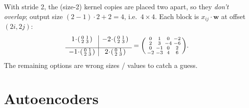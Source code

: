 \documentclass[11pt,oneside]{article}
\newenvironment{answerprose}[1]{%
  \begin{keybox}[Answer]}%
  {\end{keybox}}
\begin{document}
\begin{answerprose}{C, $\begin{psmallmatrix}0&1&0&-2\\2&3&-4&-6\\0&-1&0&2\\-2&-3&4&6\end{psmallmatrix}$}
With stride 2, the (size-2) kernel copies are placed two apart, so they \emph{don't overlap}; output size
$(2-1)\cdot 2 + 2 = 4$, i.e.\ $4\times4$. Each block is $x_{ij}\cdot\mathbf{w}$ at offset $(2i,2j)$:
\[
\begin{array}{c|c}
1\!\cdot\!\begin{psmallmatrix}0&1\\2&3\end{psmallmatrix} & -2\!\cdot\!\begin{psmallmatrix}0&1\\2&3\end{psmallmatrix}\\[6pt]\hline
-1\!\cdot\!\begin{psmallmatrix}0&1\\2&3\end{psmallmatrix} & 2\!\cdot\!\begin{psmallmatrix}0&1\\2&3\end{psmallmatrix}
\end{array}
=\begin{psmallmatrix}0&1&0&-2\\2&3&-4&-6\\0&-1&0&2\\-2&-3&4&6\end{psmallmatrix}.
\]
The remaining options are wrong sizes / values to catch a guess.
\end{answerprose}


\section{Autoencoders}
\end{document}
